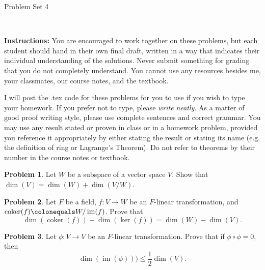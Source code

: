 \documentclass[11pt]{article}
\title{}
\date{\vspace{-0.5in}}
\DeclareMathOperator{\coker}{coker}
\DeclareMathOperator{\im}{im}
\theoremstyle{definition}
\newtheorem{problem}{Problem}
\begin{document}
\thispagestyle{fancy}
\pagestyle{fancy}

\vspace{3em}

\begin{center}
	{\LARGE Problem Set 4}
\end{center}

\

\noindent
{\bf Instructions:}
You are encouraged to work together on these problems, but each student should hand in their own final draft, written in a way that indicates their individual understanding of the solutions. Never submit something for grading that you do not completely understand. You cannot use any resources besides me, your classmates, our course notes, and the textbook.


I will post the .tex code for these problems for you to use if you wish to type your homework. If you prefer not to type, please  {\em write neatly}. As a matter of good proof writing style, please use complete sentences and correct grammar. You may use any result  stated or proven in class or in a homework problem, provided you reference it appropriately by either stating the result or stating its name (e.g. the definition of ring or Lagrange's Theorem). Do not refer to theorems by their number in the course notes or textbook.


\vspace{2em}





\begin{problem}
	Let $W$ be a subspace of a vector space $V$. Show that $\dim(V) = \dim(W) + \dim(V/W)$.
\end{problem}





\begin{problem} 
Let $F$ be a field, $f\!: V \to W$ be an $F$-linear transformation, and $\coker(f) \colonequals W/\im(f)$. Prove that
$$\dim(\coker(f)) - \dim(\ker(f)) = \dim(W) - \dim(V).$$
\end{problem}




\begin{problem}
Let $\phi: V \to V$ be an $F$-linear transformation. Prove that if $\phi \circ \phi  = 0$, then
$$\dim(\im(\phi))) \leqslant \frac{1}{2} \dim(V).$$
\end{problem}
\end{document}
